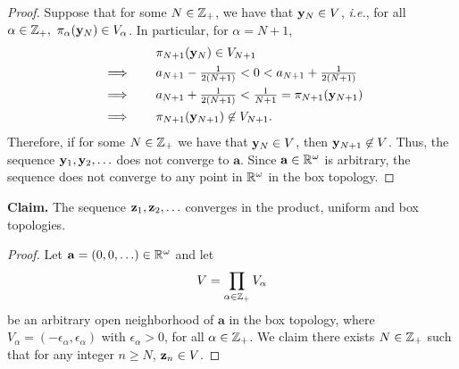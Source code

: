 \begin{solution}
\begin{proof}
        Suppose that for some $N \in \mathbb{Z}_+$, we have that $\mathbf{y}_N \in V$, \textit{i.e.}, for all $\alpha \in \mathbb{Z}_+,~ \pi_\alpha(\mathbf{y}_N) \in V_\alpha$.
        In particular, for $\alpha = N+1$,
        \begin{alignat*}{2}
            &           && \quad \pi_{N+1}(\mathbf{y}_N) \in V_{N+1} \\
            & \implies  && \quad a_{N+1} - \tfrac{1}{2(N+1)} < 0 < a_{N+1} + \tfrac{1}{2(N+1)} \\
            & \implies  && \quad a_{N+1} + \tfrac{1}{2(N+1)} < \tfrac{1}{N + 1} = \pi_{N+1}(\mathbf{y}_{N+1}) \\
            & \implies  && \quad \pi_{N+1}(\mathbf{y}_{N+1}) \not\in V_{N+1}.
        \end{alignat*}
        Therefore, if for some $N \in \mathbb{Z}_+$ we have that $\mathbf{y}_N \in V$, then $\mathbf{y}_{N+1} \not\in V$.
        Thus, the sequence $\mathbf{y}_1, \mathbf{y}_2, \ldots$ does not converge to $\mathbf{a}$.
        Since $\mathbf{a} \in \mathbb{R}^\omega$ is arbitrary, the sequence does not converge to any point in $\mathbb{R}^\omega$ in the box topology.
    \end{proof}
    \bigskip

    \textbf{Claim.} The sequence $\mathbf{z}_1, \mathbf{z}_2, \ldots$ converges in the product, uniform and box topologies.
    \begin{proof}
        Let $\mathbf{a} = (0, 0, \ldots) \in \mathbb{R}^\omega$ and let
        \begin{equation*}
            V = \prod_{\alpha\in\mathbb{Z}_+} V_\alpha
        \end{equation*}
        be an arbitrary open neighborhood of $\mathbf{a}$ in the box topology, where $V_\alpha = (-\epsilon_\alpha, \epsilon_\alpha)$ with $\epsilon_\alpha > 0$, for all $\alpha \in \mathbb{Z}_+$.
        We claim there exists $N \in \mathbb{Z}_+$ such that for any integer $n \geq N$, $\mathbf{z}_n \in V$.


\end{proof}
\end{solution}
